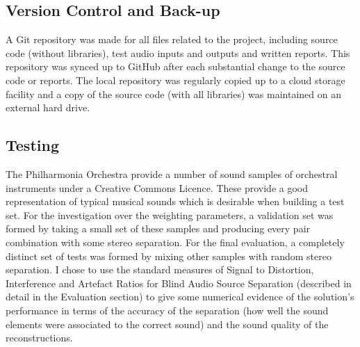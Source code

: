 \documentclass[12pt,a4paper,twoside,openright]{report}
\begin{document}
\subsection{Version Control and Back-up}

A Git repository was made for all files related to the project, including source code (without libraries), test audio inputs and outputs and written reports. This repository was synced up to GitHub after each substantial change to the source code or reports. The local repository was regularly copied up to a cloud storage facility and a copy of the source code (with all libraries) was maintained on an external hard drive.

\subsection{Testing}

The Philharmonia Orchestra provide a number of sound samples \cite{philharmonia} of orchestral instruments under a Creative Commons Licence. These provide a good representation of typical musical sounds which is desirable when building a test set. For the investigation over the weighting parameters, a validation set was formed by taking a small set of these samples and producing every pair combination with some stereo separation. For the final evaluation, a completely distinct set of tests was formed by mixing other samples with random stereo separation. I chose to use the standard measures of Signal to Distortion, Interference and Artefact Ratios for Blind Audio Source Separation (described in detail in the Evaluation section) to give some numerical evidence of the solution's performance in terms of the accuracy of the separation (how well the sound elements were associated to the correct sound) and the sound quality of the reconstructions.


\end{document}
